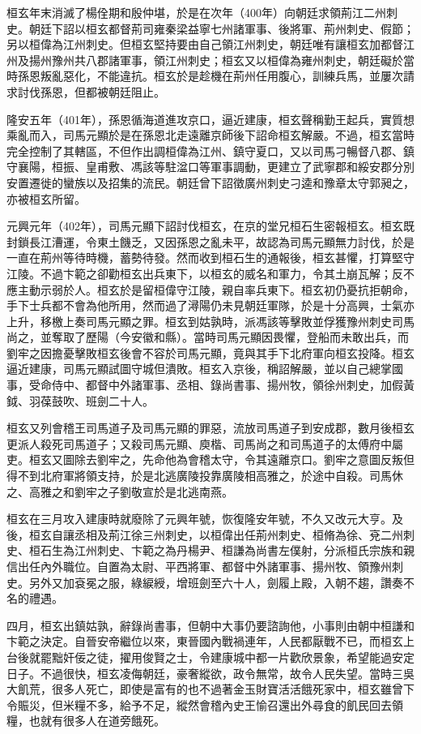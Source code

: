 桓玄年末消滅了楊佺期和殷仲堪，於是在次年（400年）向朝廷求領荊江二州刺史。朝廷下詔以桓玄都督荊司雍秦梁益寧七州諸軍事、後將軍、荊州刺史、假節；另以桓偉為江州刺史。但桓玄堅持要由自己領江州刺史，朝廷唯有讓桓玄加都督江州及揚州豫州共八郡諸軍事，領江州刺史；桓玄又以桓偉為雍州刺史，朝廷礙於當時孫恩叛亂惡化，不能違抗。桓玄於是趁機在荊州任用腹心，訓練兵馬，並屢次請求討伐孫恩，但都被朝廷阻止。

隆安五年（401年），孫恩循海道進攻京口，逼近建康，桓玄聲稱勤王起兵，實質想乘亂而入，司馬元顯於是在孫恩北走遠離京師後下詔命桓玄解嚴。不過，桓玄當時完全控制了其轄區，不但作出調桓偉為江州、鎮守夏口，又以司馬刁暢督八郡、鎮守襄陽，桓振、皇甫敷、馮該等駐湓口等軍事調動，更建立了武寧郡和綏安郡分別安置遷徙的蠻族以及招集的流民。朝廷曾下詔徵廣州刺史刁逵和豫章太守郭昶之，亦被桓玄所留。

元興元年（402年），司馬元顯下詔討伐桓玄，在京的堂兄桓石生密報桓玄。桓玄既封鎖長江漕運，令東土饑乏，又因孫恩之亂未平，故認為司馬元顯無力討伐，於是一直在荊州等待時機，蓄勢待發。然而收到桓石生的通報後，桓玄甚懼，打算堅守江陵。不過卞範之卻勸桓玄出兵東下，以桓玄的威名和軍力，令其土崩瓦解；反不應主動示弱於人。桓玄於是留桓偉守江陵，親自率兵東下。桓玄初仍憂抗拒朝命，手下士兵都不會為他所用，然而過了潯陽仍未見朝廷軍隊，於是十分高興，士氣亦上升，移檄上奏司馬元顯之罪。桓玄到姑孰時，派馮該等擊敗並俘獲豫州刺史司馬尚之，並奪取了歷陽（今安徽和縣）。當時司馬元顯因畏懼，登船而未敢出兵，而劉牢之因擔憂擊敗桓玄後會不容於司馬元顯，竟與其手下北府軍向桓玄投降。桓玄逼近建康，司馬元顯試圖守城但潰敗。桓玄入京後，稱詔解嚴，並以自己總掌國事，受命侍中、都督中外諸軍事、丞相、錄尚書事、揚州牧，領徐州刺史，加假黃鉞、羽葆鼓吹、班劍二十人。

桓玄又列會稽王司馬道子及司馬元顯的罪惡，流放司馬道子到安成郡，數月後桓玄更派人殺死司馬道子；又殺司馬元顯、庾楷、司馬尚之和司馬道子的太傅府中屬吏。桓玄又圖除去劉牢之，先命他為會稽太守，令其遠離京口。劉牢之意圖反叛但得不到北府軍將領支持，於是北逃廣陵投靠廣陵相高雅之，於途中自殺。司馬休之、高雅之和劉牢之子劉敬宣於是北逃南燕。

桓玄在三月攻入建康時就廢除了元興年號，恢復隆安年號，不久又改元大亨。及後，桓玄自讓丞相及荊江徐三州刺史，以桓偉出任荊州刺史、桓脩為徐、兗二州刺史、桓石生為江州刺史、卞範之為丹楊尹、桓謙為尚書左僕射，分派桓氏宗族和親信出任內外職位。自置為太尉、平西將軍、都督中外諸軍事、揚州牧、領豫州刺史。另外又加袞冕之服，綠綟綬，增班劍至六十人，劍履上殿，入朝不趨，讚奏不名的禮遇。

四月，桓玄出鎮姑孰，辭錄尚書事，但朝中大事仍要諮詢他，小事則由朝中桓謙和卞範之決定。自晉安帝繼位以來，東晉國內戰禍連年，人民都厭戰不已，而桓玄上台後就罷黜奸佞之徒，擢用俊賢之士，令建康城中都一片歡欣景象，希望能過安定日子。不過很快，桓玄凌侮朝廷，豪奢縱欲，政令無常，故令人民失望。當時三吳大飢荒，很多人死亡，即使是富有的也不過著金玉財寶活活餓死家中，桓玄雖曾下令賑災，但米糧不多，給予不足，縱然會稽內史王愉召還出外尋食的飢民回去領糧，也就有很多人在道旁餓死。

